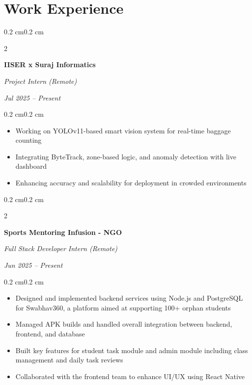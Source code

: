 \documentclass[10pt, letterpaper]{article}
\newenvironment{highlights}{
    \begin{itemize}[
        topsep=0.10 cm,
        parsep=0.10 cm,
        partopsep=0pt,
        itemsep=0pt,
        leftmargin=0.4 cm + 10pt
    ]
}{\end{itemize}}
\newenvironment{onecolentry}{
    \begin{adjustwidth}{0.2 cm}{0.2 cm}
}{\end{adjustwidth}}
\newenvironment{twocolentry}[2][]{
    \onecolentry
    \def\secondColumn{#2}
    \setcolumnwidth{\fill, 4.5 cm}
    \begin{paracol}{2}
}{
    \switchcolumn \raggedleft \secondColumn
    \end{paracol}
    \endonecolentry
}
\begin{document}
    \section{Work Experience}
    
    \begin{twocolentry}{
        \textit{Jul 2025 -- Present}
    }
        \textbf{IISER x Suraj Informatics}
        
        \textit{Project Intern (Remote)}
    \end{twocolentry}
    
    \vspace{0.10 cm}
    \begin{onecolentry}
        \begin{highlights}
            \item Working on YOLOv11-based smart vision system for real-time baggage counting
            \item Integrating ByteTrack, zone-based logic, and anomaly detection with live dashboard
            \item Enhancing accuracy and scalability for deployment in crowded environments
        \end{highlights}
    \end{onecolentry}

    \vspace{0.2 cm}

    \begin{twocolentry}{
        \textit{Jun 2025 -- Present}
    }
        \textbf{Sports Mentoring Infusion - NGO}
        
        \textit{Full Stack Developer Intern (Remote)}
    \end{twocolentry}
    
    \vspace{0.10 cm}
    \begin{onecolentry}
        \begin{highlights}
            \item Designed and implemented backend services using Node.js and PostgreSQL for Swabhav360, a platform aimed at supporting 100+ orphan students
            \item Managed APK builds and handled overall integration between backend, frontend, and database
            \item Built key features for student task module and admin module including class management and daily task reviews
            \item Collaborated with the frontend team to enhance UI/UX using React Native
        \end{highlights}
    \end{onecolentry}
\end{document}
